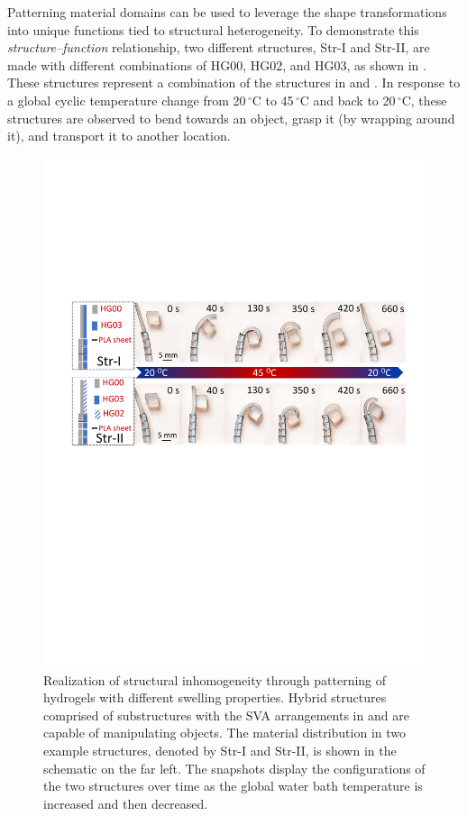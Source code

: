 Patterning material domains can be used to leverage the shape transformations into unique functions tied to structural heterogeneity. To demonstrate this \textit{structure--function} relationship, two different structures, Str-I and Str-II, are made with different combinations of HG00, HG02, and HG03, as shown in . These structures represent a combination of the structures in  and . In response to a global cyclic temperature change from 20\,$^{\circ}$C to 45\,$^{\circ}$C and back to 20\,$^{\circ}$C, these structures are observed to bend towards an object, grasp it (by wrapping around it), and transport it to another location. 
\begin{figure}[!ht]
\centering
\includegraphics[width=\textwidth]{hardcodedrobot.pdf}
\caption[Object transport in hard-coded structures]{Realization of structural inhomogeneity through patterning of hydrogels with different swelling properties. Hybrid structures comprised of substructures with the SVA arrangements in  and  are capable of manipulating objects. The material distribution in two example structures, denoted by Str-I and Str-II, is shown in the schematic on the far left. The snapshots display the configurations of the two structures over time as the global water bath temperature is increased and then decreased.}
\label{fig:hardcodedrobot}
\end{figure}

